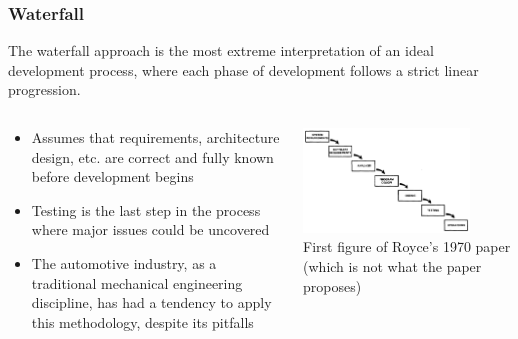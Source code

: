 \begin{frame}
\frametitle{Waterfall}
The waterfall approach is the most extreme interpretation of an ideal
development process, where each phase of development follows a strict
linear progression.
\begin{columns}[]
    \begin{column}{0.5\textwidth}
        \begin{itemize}
            \item Assumes that requirements, architecture design, etc. are
                correct and fully known before development begins
            \item Testing is the last step in the process where major issues
                could be uncovered
            \item The automotive industry, as a traditional mechanical
                engineering discipline, has had a tendency to apply this
                methodology, despite its pitfalls
        \end{itemize}
    \end{column}
    \begin{column}{0.5\textwidth}
        \centering
        \includegraphics[width=0.8\textwidth]{images/royce_waterfall.png}\\
        \footnotesize
        First figure of Royce's 1970 paper \cite{Royce70} (which is not what
        the paper proposes)
    \end{column}
\end{columns}
\end{frame}

